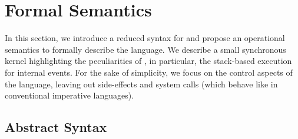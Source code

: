 \newcommand{\NST}{\1\xrightarrow[\mathit{nst}]\1}
\newcommand{\OUT}{\1\xrightarrow[\mathit{out}]\1}
\newcommand{\LL}{\langle}
\newcommand{\RR}{\rangle}
\newcommand{\DS}{\displaystyle}

\newcommand{\1}{\;}
\newcommand{\2}{\;\;}
\newcommand{\3}{\;\;\;}
\newcommand{\5}{\;\;\;\;\;}

\section{Formal Semantics}
\label{sec.sem}

In this section, we introduce a reduced syntax for \CEU and propose an 
operational semantics to formally describe the language.
We describe a small synchronous kernel highlighting the peculiarities of \CEU, 
in particular, the stack-based execution for internal events.
%
For the sake of simplicity, we focus on the control aspects of the language, 
leaving out side-effects and system calls (which behave like in conventional 
imperative languages).

\subsection{Abstract Syntax}
\label{sec.sem.syntax}


